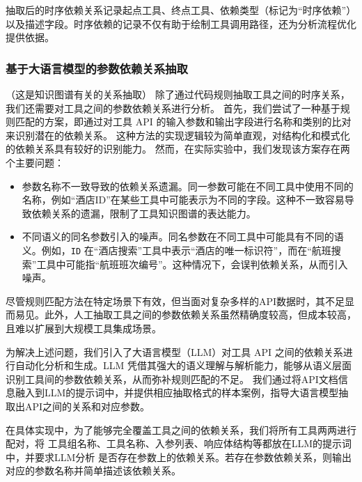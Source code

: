 抽取后的时序依赖关系记录起点工具、终点工具、依赖类型（标记为“时序依赖”）以及描述字段。时序依赖的记录不仅有助于绘制工具调用路径，还为分析流程优化提供依据。

\subsubsection{基于大语言模型的参数依赖关系抽取}

（这是知识图谱有关的关系抽取）
除了通过代码规则抽取工具之间的时序关系，我们还需要对工具之间的参数依赖关系进行分析。
首先，我们尝试了一种基于规则匹配的方案，即通过对工具 API 的输入参数和输出字段进行名称和类别的比对来识别潜在的依赖关系。
这种方法的实现逻辑较为简单直观，对结构化和模式化的依赖关系具有较好的识别能力。
然而，在实际实验中，我们发现该方案存在两个主要问题：

\begin{itemize}
    \item 参数名称不一致导致的依赖关系遗漏。同一参数可能在不同工具中使用不同的名称，例如“酒店ID”在某些工具中可能表示为不同的字段。这种不一致容易导致依赖关系的遗漏，限制了工具知识图谱的表达能力。
    \item 不同语义的同名参数引入的噪声。同名参数在不同工具中可能具有不同的语义。例如，\texttt{ID} 在“酒店搜索”工具中表示“酒店的唯一标识符”，而在“航班搜索”工具中可能指“航班班次编号”。这种情况下，会误判依赖关系，从而引入噪声。
\end{itemize}

尽管规则匹配方法在特定场景下有效，但当面对复杂多样的API数据时，其不足显而易见。此外，人工抽取工具之间的参数依赖关系虽然精确度较高，但成本较高，且难以扩展到大规模工具集成场景。

为解决上述问题，我们引入了大语言模型（LLM）对工具 API 之间的依赖关系进行自动化分析和生成。LLM 凭借其强大的语义理解与解析能力，能够从语义层面识别工具间的参数依赖关系，从而弥补规则匹配的不足。
我们通过将API文档信息融入到LLM的提示词中，并提供相应抽取格式的样本案例，指导大语言模型抽取出API之间的关系和对应参数。

在具体实现中，为了能够完全覆盖工具之间的依赖关系，我们将所有工具两两进行配对，将
工具组名称、工具名称、入参列表、响应体结构等都放在LLM的提示词中，并要求LLM分析
是否存在参数上的依赖关系。若存在参数依赖关系，则输出对应的参数名称并简单描述该依赖关系。


